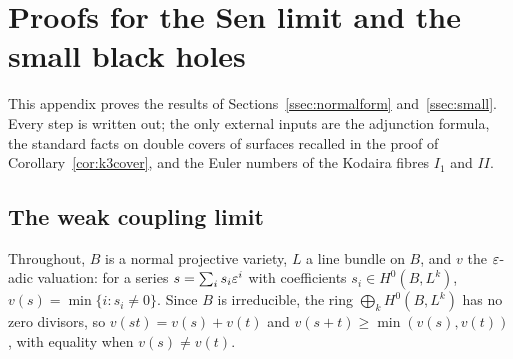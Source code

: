 \section{Proofs for the Sen limit and the small black holes}\label{app:closures}

This appendix proves the results of Sections~\ref{ssec:normalform} and~\ref{ssec:small}. Every step is written out; the only external inputs are the adjunction formula, the standard facts on double covers of surfaces recalled in the proof of Corollary~\ref{cor:k3cover}, and the Euler numbers of the Kodaira fibres $I_1$ and $II$.

\subsection{The weak coupling limit}

Throughout, $B$ is a normal projective variety, $L$ a line bundle on $B$, and $v$ the $\varepsilon$-adic valuation: for a series $s=\sum_is_i\varepsilon^i$ with coefficients $s_i\in H^0(B,L^k)$, $v(s)=\min\{i:s_i\ne0\}$. Since $B$ is irreducible, the ring $\bigoplus_kH^0(B,L^k)$ has no zero divisors, so $v(st)=v(s)+v(t)$ and $v(s+t)\ge\min(v(s),v(t))$, with equality when $v(s)\ne v(t)$.

